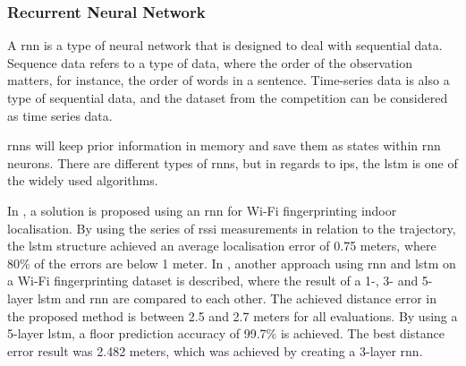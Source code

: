 \subsubsection{Recurrent Neural Network} \label{rnn1}
A \gls{rnn} is a type of neural network that is designed to deal with sequential data. Sequence data refers to a type of data, where the order of the observation matters, for instance, the order of words in a sentence. Time-series data is also a type of sequential data, and the dataset from the competition can be considered as time series data.\cite{Yalcın2021}  

\gls{rnn}s will keep prior information in memory and save them as states within \gls{rnn} neurons. There are different types of \gls{rnn}s, but in regards to \gls{ips}, the \gls{lstm} is one of the widely used algorithms\cite{9276894, 8690989, 8005874}. %



In \cite{8830368}, a solution is proposed using an \gls{rnn} for Wi-Fi fingerprinting indoor localisation. By using the series of \gls{rssi} measurements in relation to the trajectory, the \gls{lstm} structure achieved an average localisation error of 0.75 meters, where 80\% of the errors are below 1 meter. In \cite{8690989}, another approach using \gls{rnn} and \gls{lstm} on a Wi-Fi fingerprinting dataset is described, where the result of a 1-, 3- and 5-layer \gls{lstm} and \gls{rnn} are compared to each other. The achieved distance error in the proposed method is between 2.5 and 2.7 meters for all evaluations. By using a 5-layer \gls{lstm}, a floor prediction accuracy of 99.7\% is achieved. The best distance error result was 2.482 meters, which was achieved by creating a 3-layer \gls{rnn}.

